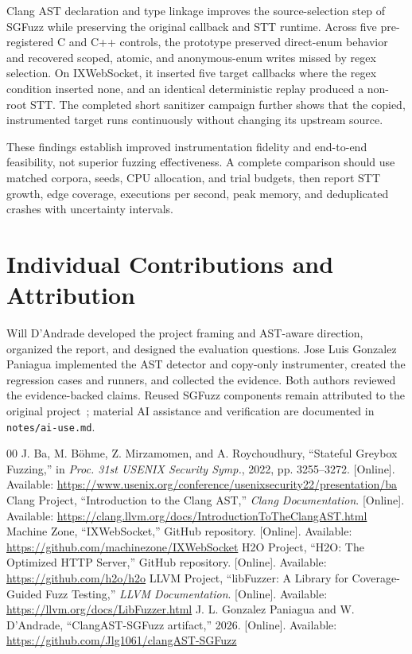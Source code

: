 \documentclass[conference]{IEEEtran}
\begin{document}
Clang AST declaration and type linkage improves the source-selection step of
SGFuzz while preserving the original callback and STT runtime. Across five
pre-registered C and C++ controls, the prototype preserved direct-enum behavior
and recovered scoped, atomic, and anonymous-enum writes missed by regex
selection. On IXWebSocket, it inserted five target callbacks where the regex
condition inserted none, and an identical deterministic replay produced a
non-root STT. The completed short sanitizer campaign further shows that the
copied, instrumented target runs continuously without changing its upstream
source.

These findings establish improved instrumentation fidelity and end-to-end
feasibility, not superior fuzzing effectiveness. A complete comparison should
use matched corpora, seeds, CPU allocation, and trial budgets, then report STT
growth, edge coverage, executions per second, peak memory, and deduplicated
crashes with uncertainty intervals.

\section*{Individual Contributions and Attribution}

Will D'Andrade developed the project framing and AST-aware direction, organized
the report, and designed the evaluation questions. Jose Luis Gonzalez Paniagua
implemented the AST detector and copy-only instrumenter, created the regression
cases and runners, and collected the evidence. Both authors reviewed the
evidence-backed claims. Reused SGFuzz components remain attributed to the
original project~\cite{ba2022}; material AI assistance and verification are
documented in \texttt{notes/ai-use.md}.

\begin{thebibliography}{00}
 J. Ba, M. B\"ohme, Z. Mirzamomen, and A. Roychoudhury,
``Stateful Greybox Fuzzing,'' in \emph{Proc. 31st USENIX Security Symp.},
2022, pp. 3255--3272. [Online]. Available:
\url{https://www.usenix.org/conference/usenixsecurity22/presentation/ba}
 Clang Project, ``Introduction to the Clang AST,''
\emph{Clang Documentation}. [Online]. Available:
\url{https://clang.llvm.org/docs/IntroductionToTheClangAST.html}
 Machine Zone, ``IXWebSocket,'' GitHub repository.
[Online]. Available: \url{https://github.com/machinezone/IXWebSocket}
 H2O Project, ``H2O: The Optimized HTTP Server,'' GitHub
repository. [Online]. Available: \url{https://github.com/h2o/h2o}
 LLVM Project, ``libFuzzer: A Library for Coverage-Guided
Fuzz Testing,'' \emph{LLVM Documentation}. [Online]. Available:
\url{https://llvm.org/docs/LibFuzzer.html}
 J. L. Gonzalez Paniagua and W. D'Andrade,
``ClangAST-SGFuzz artifact,'' 2026. [Online]. Available:
\url{https://github.com/Jlg1061/clangAST-SGFuzz}
\end{thebibliography}
\end{document}
